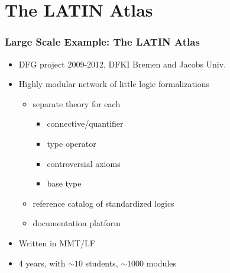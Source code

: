 \documentclass{beamer}
\begin{document}
\section{The LATIN Atlas}

\newcommand{\found}{\mathcal{F}}
\newcommand{\defemph}[1]{{\bf #1}}
\newcommand{\LS}{L}
\newcommand{\LM}{L^{\mathit{Mod}}}
\newcommand{\Lm}{L^{\mathit{mod}}}
\providecommand{\ded}{\mathtt{ded}}
\newcommand{\SigS}{\Sigma}
\newcommand{\SigM}{\Sigma^{\mathit{Mod}}}
\newcommand{\Sigm}{\Sigma^{\mathit{mod}}}
\newcommand{\aMod}{M}
\newcommand{\set}{set}

\newcommand{\folsyn}{\mathit{FOL}}
\newcommand{\folmod}{\mathit{FOL}^{\mathit{Mod}}}
\newcommand{\fol}{\mathit{FOL}}
\newcommand{\monsyn}{\mathit{Monoid}^{\mathit{syn}}}
\newcommand{\monmod}{\mathit{Monoid}^{\mathit{mod}}}
\newcommand{\assoc}{\mathit{assoc}}
\newcommand{\neutr}{\mathit{neut}}

\begin{frame}\frametitle{Large Scale Example: The LATIN Atlas}
\begin{itemize}
 \item DFG project 2009-2012, DFKI Bremen and Jacobs Univ.
 \item Highly modular network of little logic formalizations
	  \begin{itemize}
	    \item separate theory for each
	    \begin{itemize}
	     \item connective/quantifier
	     \item type operator
	     \item controversial axioms
	     \item base type
	    \end{itemize}
	    \item reference catalog of standardized logics
	    \item documentation platform
	  \end{itemize}
 \item Written in MMT/LF
 \item 4 years, with $\sim 10$ students, $\sim 1000$ modules
\end{itemize}
\end{frame}
\end{document}
